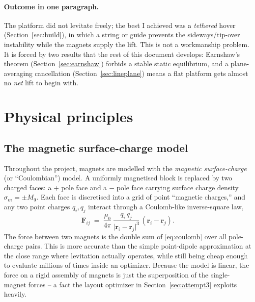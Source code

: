 \documentclass[11pt]{article}
\begin{document}
\paragraph{Outcome in one paragraph.} The platform did not levitate freely; the
best I achieved was a \emph{tethered} hover (Section~\ref{sec:build}), in which
a string or guide prevents the sideways/tip-over instability while the magnets
supply the lift. This is not a workmanship problem. It is forced by two
results that the rest of this document develops: Earnshaw's theorem
(Section~\ref{sec:earnshaw}) forbids a stable static equilibrium, and a
plane-averaging cancellation (Section~\ref{sec:lineplane}) means a flat
platform gets almost no \emph{net} lift to begin with.

\section{Physical principles}\label{sec:physics}

\subsection{The magnetic surface-charge model}

Throughout the project, magnets are modelled with the \emph{magnetic
surface-charge} (or ``Coulombian'') model. A uniformly magnetised block is
replaced by two charged faces: a $+$ pole face and a $-$ pole face carrying
surface charge density $\sigma_m = \pm M_0$. Each face is discretised into a
grid of point ``magnetic charges,'' and any two point charges $q_i,q_j$
interact through a Coulomb-like inverse-square law,
%
\begin{equation}
  \mathbf{F}_{ij} \;=\; \frac{\mu_0}{4\pi}\,
  \frac{q_i\,q_j}{\lvert \mathbf{r}_i-\mathbf{r}_j\rvert^{3}}\,
  (\mathbf{r}_i-\mathbf{r}_j).
  \label{eq:coulomb}
\end{equation}
%
The force between two magnets is the double sum of \eqref{eq:coulomb} over all
pole-charge pairs. This is more accurate than the simple point-dipole
approximation at the close range where levitation actually operates, while
still being cheap enough to evaluate millions of times inside an optimizer.
Because the model is linear, the force on a rigid assembly of magnets is just
the superposition of the single-magnet forces -- a fact the layout optimizer in
Section~\ref{sec:attempt3} exploits heavily.
\end{document}

